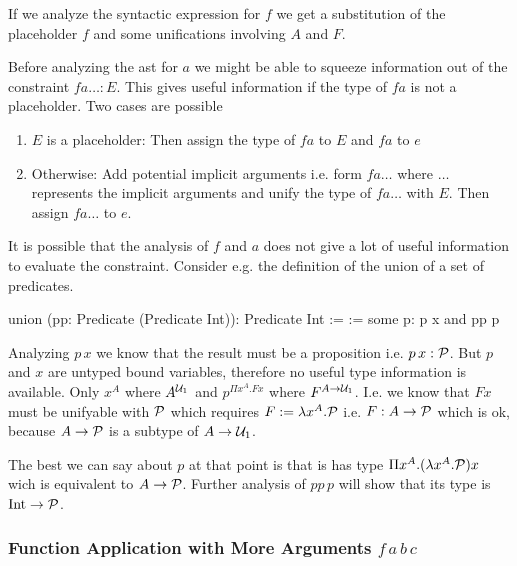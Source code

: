 If we analyze the syntactic expression for $f$ we get a substitution of the
placeholder $f$ and some unifications involving $A$ and $F$.


Before analyzing the ast for $a$ we might be able to squeeze information out of
the constraint $f a \ldots: E$. This gives useful information if the type of $f
a$ is not a placeholder. Two cases are possible
\begin{enumerate}

\item $E$ is a placeholder: Then assign the type of $f a$ to $E$ and $f a$ to $e$

\item Otherwise: Add potential implicit arguments i.e. form $f a \ldots$ where
$\ldots$ represents the implicit arguments and unify the type of $f a \ldots$
with $E$. Then assign $f a \ldots$ to $e$.

\end{enumerate}


It is possible that the analysis of $f$ and $a$ does not give a lot of useful
information to evaluate the constraint. Consider e.g. the definition of the
union of a set of predicates.

\begin{alba}
    union (pp: Predicate (Predicate Int)): Predicate Int :=
        \x := some p: p x and pp p
\end{alba}

Analyzing $p\,x$ we know that the result must be a proposition i.e. $p\,x:
{\cal{P}}$. But $p$ and $x$ are untyped bound variables, therefore no useful type
information is available.  Only $x^A$ where $A^{{\cal{U}}_1}$ and $p^{\Pi x^A. F x}$
where $F^{A \to {\cal{U}}_1}$. I.e. we know that $F x$ must be unifyable with ${\cal{P}}$
which requires $F := \lambda x^A.{\cal{P}}$ i.e. $F: A \to {\cal{P}}$ which is ok,
because $A\to{\cal{P}}$ is a subtype of $A\to{\cal{U}}_1$.

The best we can say about $p$ at that point is that is has type $\Pi x^A .
(\lambda x^A. {\cal{P}}) x$ wich is equivalent to $A\to{\cal{P}}$. Further analysis of
$pp\,p$ will show that its type is $\text{Int}\to{\cal{P}}$.








\subsubsection{Function Application with More Arguments $f\, a\, b\, c$}



